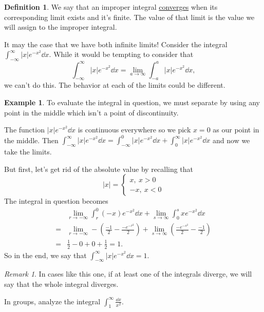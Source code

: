 \documentclass[12pt]{article}
\theoremstyle{plain}
\theoremstyle{definition}
\newtheorem*{Def}{Definition}       %
\newtheorem{Ex}[Th]{Example}           %
\theoremstyle{remark}
\newtheorem*{Rmk}{Remark}      %
\renewcommand{\:}{\colon}           %
\newcommand{\un}[1]{\underline{#1}}
\renewcommand{\.}{\Cdot}                %
\begin{document}
\begin{multicols}{2}
\begin{Def}
  We say that an improper integral \un{converges} when its corresponding limit exists and it's finite. The value of that limit is the value we will assign to the improper integral.
  \end{Def}
  
  It may the case that we have both infinite limits! Consider the integral $\displaystyle\int_{-\infty}^\infty|x|e^{-x^2}\dd x$. While it would be tempting to consider that 
  $$\int_{-\infty}^\infty|x|e^{-x^2}\dd x=\lim_{a\to\infty}\int_{-a}^a|x|e^{-x^2}\dd x,$$
we can't do this. The behavior at each of the limits could be different.

  \begin{Ex}
    To evaluate the integral in question, we must separate by using any point in the middle which isn't a point of discontinuity.\par 
    The function $|x|e^{-x^2}\dd x$ is continuous everywhere so we pick $x=0$ as our point in the middle. Then
    $\int_{-\infty}^\infty|x|e^{-x^2}\dd x=\int_{-\infty}^0|x|e^{-x^2}\dd x+\int_{0}^\infty|x|e^{-x^2}\dd x$
    and now we take the limits.\par 
    But first, let's get rid of the absolute value by recalling that 
    $$|x|=\left\lbrace\begin{aligned}
      x,\ x>0\\
-x,\ x<0
    \end{aligned}\right.$$
    The integral in question becomes
    \begin{align*}
      &\lim_{r\to-\infty}\int_{r}^0(-x)e^{-x^2}\dd x+\lim_{s\to\infty}\int_{0}^sxe^{-x^2}\dd x\\
      =&\lim_{r\to-\infty}-\left(\frac{-1}{2}-\frac{-e^{-r^2}}{2}\right)+\lim_{s\to\infty}\left(\frac{-e^{-s^2}}{2}-\frac{-1}{2}\right)\\
      =&\frac{1}{2}-0+0+\frac{1}{2}=1.
    \end{align*}
    So in the end, we say that $\displaystyle\int_{-\infty}^\infty|x|e^{-x^2}\dd x=1$.
  \end{Ex}
  \begin{Rmk}
In cases like this one, if at least one of the integrals diverge, we will say that the whole integral diverges.
  \end{Rmk}
  \vfill\null
  \newpage
  \begin{ptcbP}
In groups, analyze the integral $\displaystyle\int_{1}^\infty\frac{\dd x}{x^2}$.
\vspace*{-0.5em}
\begin{enumerate}[i)]

\end{enumerate}
\end{ptcbP}
\end{multicols}
\end{document}
